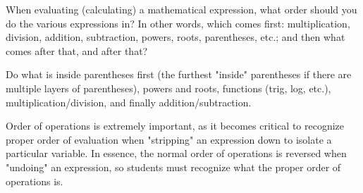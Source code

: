 

When evaluating (calculating) a mathematical expression, what order should you do the various expressions in?  In other words, which comes first: multiplication, division, addition, subtraction, powers, roots, parentheses, etc.; and then what comes after that, and after that?







Do what is inside parentheses first (the furthest "inside" parentheses if there are multiple layers of parentheses), powers and roots, functions (trig, log, etc.), multiplication/division, and finally addition/subtraction.







Order of operations is extremely important, as it becomes critical to recognize proper order of evaluation when "stripping" an expression down to isolate a particular variable.  In essence, the normal order of operations is reversed when "undoing" an expression, so students must recognize what the proper order of operations is.




